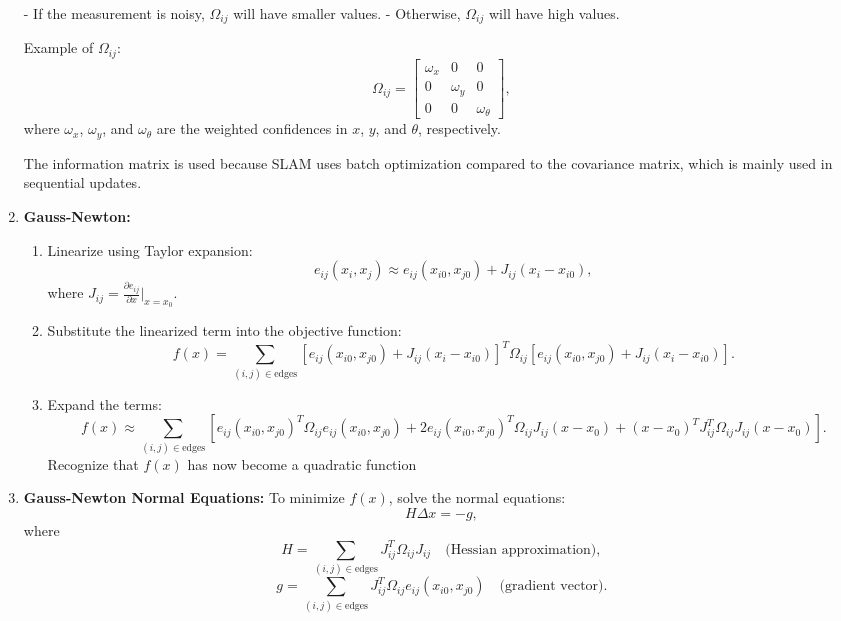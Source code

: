 \begin{enumerate}
    - If the measurement is noisy, $\Omega_{ij}$ will have smaller values.
    - Otherwise, $\Omega_{ij}$ will have high values.

    Example of $\Omega_{ij}$:
    \[
    \Omega_{ij} = 
    \begin{bmatrix}
        \omega_x & 0 & 0 \\
        0 & \omega_y & 0 \\
        0 & 0 & \omega_\theta
    \end{bmatrix},
    \]
    where $\omega_x$, $\omega_y$, and $\omega_\theta$ are the weighted confidences in $x$, $y$, and $\theta$, respectively.

    The information matrix is used because SLAM uses batch optimization compared to the covariance matrix, which is mainly used in sequential updates.

    \item \textbf{Gauss-Newton:}
    \begin{enumerate}
        \item Linearize using Taylor expansion:
        \[
        e_{ij}(x_{i}, x_{j}) \approx e_{ij}(x_{i0}, x_{j0}) + J_{ij}(x_{i} - x_{i0}),
        \]
        where $J_{ij} = \frac{\partial e_{ij}}{\partial x}\bigg|_{x=x_{0}}$.

        \item Substitute the linearized term into the objective function:
        \[
        f(x) = \sum_{(i,j) \in \text{edges}} \left[ e_{ij}(x_{i0}, x_{j0}) + J_{ij}(x_{i} - x_{i0}) \right]^T \Omega_{ij} \left[ e_{ij}(x_{i0}, x_{j0}) + J_{ij}(x_{i} - x_{i0}) \right].
        \]

        \item Expand the terms:
        \[
        f(x) \approx \sum_{(i,j) \in \text{edges}} \left[ e_{ij}(x_{i0}, x_{j0})^T \Omega_{ij} e_{ij}(x_{i0}, x_{j0}) + 2 e_{ij}(x_{i0}, x_{j0})^T \Omega_{ij} J_{ij} (x - x_0) + (x - x_0)^T J_{ij}^T \Omega_{ij} J_{ij} (x - x_0) \right].
        \]
        Recognize that $f(x)$ has now become a quadratic function
    \end{enumerate}

    \item \textbf{Gauss-Newton Normal Equations:}
    To minimize $f(x)$, solve the normal equations:
    \[
    H \Delta x = -g,
    \]
    where 
    \[
    H = \sum_{(i,j) \in \text{edges}} J_{ij}^T \Omega_{ij} J_{ij} \quad \text{(Hessian approximation)},
    \]
    \[
    g = \sum_{(i,j) \in \text{edges}} J_{ij}^T \Omega_{ij} e_{ij}(x_{i0}, x_{j0}) \quad \text{(gradient vector)}.
    \]


\end{enumerate}
